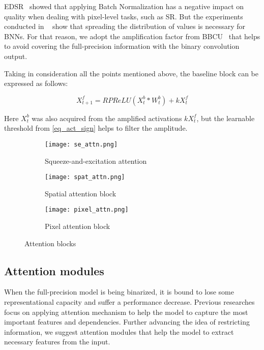 \documentclass{article}
\begin{document}
EDSR~\cite{lim2017enhanced} showed that applying Batch Normalization has a negative impact on quality when dealing with pixel-level tasks, such as SR. But the experiments conducted in ~\cite{xia2022basic} show that spreading the distribution of values is necessary for BNNs. For that reason, we adopt the amplification factor from BBCU~\cite{xia2022basic} that helps to avoid covering the full-precision information with the binary convolution output. 

Taking in consideration all the points mentioned above, the baseline block can be expressed as follows:

\begin{equation}
    X_{t+1}^f = RPReLU(X_{t}^b \ast W_t^b) + kX_t^f
\end{equation}

Here $X_{t}^b$ was also acquired from the amplified activations $kX_t^f$, but the learnable threshold from \ref{eq_act_sign} helps to filter the amplitude. 

\begin{figure}[t]
\centering
  \begin{subfigure}[c]{0.33\textwidth}
    \texttt{[image: se\_attn.png]}
    \caption{Squeeze-and-excitation attention} \label{blocks:a}
  \end{subfigure}%
  \hspace*{\fill}   %
  \begin{subfigure}[c]{0.33\textwidth}
    \texttt{[image: spat\_attn.png]}
    \caption{Spatial attention block} \label{blocks:b}
  \end{subfigure}%
  \hspace*{\fill}   %
  \begin{subfigure}[c]{0.33\textwidth}
    \texttt{[image: pixel\_attn.png]}
    \caption{Pixel attention block} \label{blocks:c}
  \end{subfigure}

\caption{Attention blocks} \label{blocks}
\end{figure}

\subsection{Attention modules}
When the full-precision model is being binarized, it is bound to lose some representational capacity and suffer a performance decrease. Previous researches~\cite{guo2022join, xue2022ir2net} focus on applying attention mechanism to help the model to capture the most important features and dependencies. Further advancing the idea of restricting information, we suggest attention modules that help the model to extract necessary features from the input. 
\end{document}
